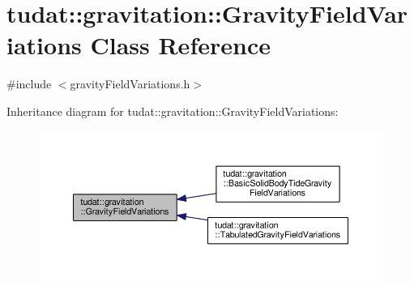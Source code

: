 \hypertarget{classtudat_1_1gravitation_1_1GravityFieldVariations}{}\section{tudat\+:\+:gravitation\+:\+:Gravity\+Field\+Variations Class Reference}
\label{classtudat_1_1gravitation_1_1GravityFieldVariations}


{\ttfamily \#include $<$gravity\+Field\+Variations.\+h$>$}



Inheritance diagram for tudat\+:\+:gravitation\+:\+:Gravity\+Field\+Variations\+:
\nopagebreak
\begin{figure}[H]
\begin{center}
\leavevmode
\includegraphics[width=350pt]{classtudat_1_1gravitation_1_1GravityFieldVariations__inherit__graph}
\end{center}
\end{figure}
